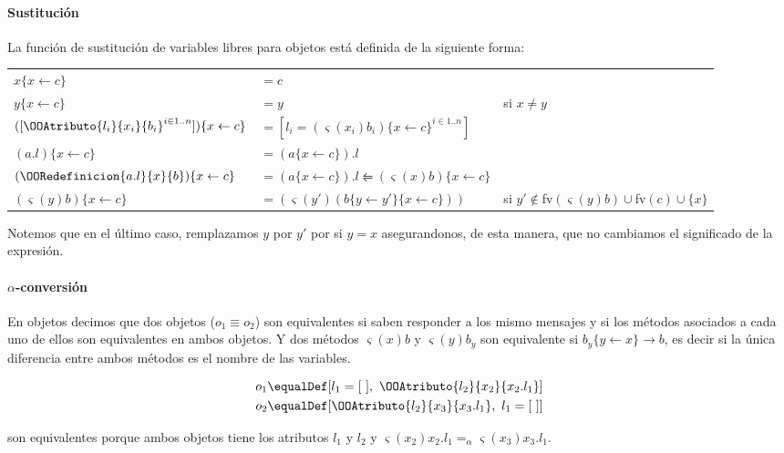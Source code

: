 \paragraph{Sustitución} La función de sustitución de variables libres para objetos está definida de la siguiente forma:

\begin{center}
\begin{tabular}{lll}
	$x\{x \leftarrow c\}$ &$= c$ & \\
	$y\{x \leftarrow c\}$ &$= y$ & si $x\neq y$\\
	$([\OOAtributo{l_i}{x_i}{b_i}^{i\in 1..n}])\{x \leftarrow c\}$ &$=  [l_i = (\varsigma(x_i)b_i)\{x \leftarrow c\}^{i\in 1..n}]$ & \\
	$(a.l)\{x \leftarrow c\}$ &$= (a\{x \leftarrow c\}).l $ & \\
	$(\OORedefinicion{a.l}{x}{b})\{x \leftarrow c\}$ &$= (a\{x \leftarrow c\}).l \leftleftharpoons (\varsigma(x)b)\{x \leftarrow c\} $ & \\
	$(\varsigma(y)b)\{x \leftarrow c\}$ &$= (\varsigma(y')(b\{y \leftarrow y'\}\{x \leftarrow c\})) $ & si $y'\notin$fv$(\varsigma(y)b)\cup$fv$(c)\cup\{x\}$ \\
\end{tabular}
\end{center}

Notemos que en el último caso, remplazamos $y$ por $y'$ por si $y = x$ asegurandonos, de esta manera, que no cambiamos el significado de la expresión.

\paragraph{$\alpha$-conversión} En objetos decimos que dos objetos ($o_1 \equiv o_2$) son equivalentes si saben responder a los mismo mensajes y si los métodos asociados a cada uno de ellos son equivalentes en ambos objetos. Y dos métodos $\varsigma(x)b$ y $\varsigma(y)b_y$ son equivalente si $b_y\{y\leftarrow x\}\longrightarrow b$, es decir si la única diferencia entre ambos métodos es el nombre de las variables.


\begin{align*}
	o_1 \equalDef [l_1 = [~],~\OOAtributo{l_2}{x_2}{x_2.l_1}] \\
	o_2 \equalDef [\OOAtributo{l_2}{x_3}{x_3.l_1},~l_1 = [~]]
\end{align*}

son equivalentes porque ambos objetos tiene los atributos $l_1$ y $l_2$ y $\varsigma(x_2) x_2.l_1 =_\alpha \varsigma(x_3) x_3.l_1$.


